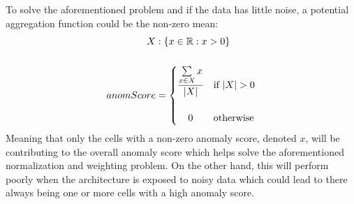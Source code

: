 To solve the aforementioned problem and if the data has little noise, a potential aggregation function could be the non-zero mean:
\begin{align*}
    X         & :\{x \in \mathbb{R} : x > 0\} \\
    \\
    anomScore & =
    \begin{cases}
        \dfrac{\sum\limits_{x \in X}x}{|X|} & \text{if } |X| > 0 \\
        \\
        \hfil 0                             & \text{otherwise}
    \end{cases}
\end{align*}
Meaning that only the cells with a non-zero anomaly score, denoted $x$, will be contributing to the overall anomaly score which helps solve the aforementioned normalization and weighting problem. On the other hand, this will perform poorly when the architecture is exposed to noisy data which could lead to there always being one or more cells with a high anomaly score.
